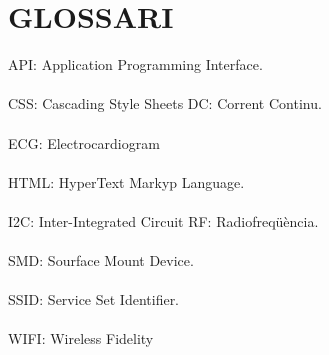 \chapter{\uppercase{Glossari}}
API: Application Programming Interface. \\ \\
CSS: Cascading Style Sheets
DC: Corrent Continu. \\ \\
ECG: Electrocardiogram \\ \\
HTML: HyperText Markyp Language. \\ \\
I2C: Inter-Integrated Circuit
RF: Radiofreqüència. \\ \\
SMD: Sourface Mount Device. \\ \\
SSID: Service Set Identifier. \\ \\
WIFI: Wireless Fidelity \\ \\




\clearpage